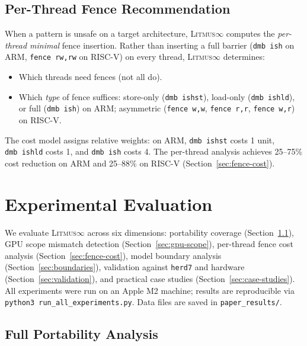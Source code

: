 \documentclass[10pt]{article}
\newcommand{\litmus}{\textsc{Litmus$\infty$}}
\begin{document}
\subsection{Per-Thread Fence Recommendation}

When a pattern is unsafe on a target architecture, \litmus{}
computes the \emph{per-thread minimal} fence insertion. Rather than
inserting a full barrier (\texttt{dmb~ish} on ARM,
\texttt{fence~rw,rw} on RISC-V) on every thread, \litmus{}
determines:
\begin{itemize}[nosep]
\item Which threads need fences (not all do).
\item Which \emph{type} of fence suffices: store-only
      (\texttt{dmb~ishst}), load-only (\texttt{dmb~ishld}), or
      full (\texttt{dmb~ish}) on ARM; asymmetric
      (\texttt{fence~w,w}, \texttt{fence~r,r},
      \texttt{fence~w,r}) on RISC-V.
\end{itemize}

\noindent The cost model assigns relative weights: on ARM,
\texttt{dmb~ishst} costs 1 unit, \texttt{dmb~ishld} costs 1,
and \texttt{dmb~ish} costs 4. The per-thread analysis achieves
25--75\% cost reduction on ARM and 25--88\% on RISC-V
(Section~\ref{sec:fence-cost}).

\section{Experimental Evaluation}
\label{sec:experiments}

We evaluate \litmus{} across six dimensions: portability coverage
(Section~\ref{sec:portability}), GPU scope mismatch detection
(Section~\ref{sec:gpu-scope}), per-thread fence cost analysis
(Section~\ref{sec:fence-cost}), model boundary analysis
(Section~\ref{sec:boundaries}), validation against \texttt{herd7} and
hardware (Section~\ref{sec:validation}), and practical case studies
(Section~\ref{sec:case-studies}). All experiments were run on an
Apple M2 machine; results are reproducible via \texttt{python3
run\_all\_experiments.py}. Data files are saved in
\texttt{paper\_results/}.

\subsection{Full Portability Analysis}
\label{sec:portability}
\end{document}
